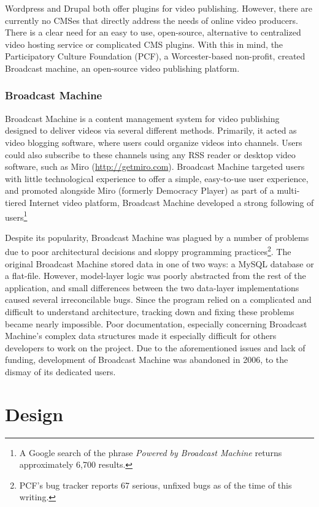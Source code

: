 \documentclass[a4paper,12pt]{report}
\begin{document}
Wordpress and Drupal both offer plugins for video publishing. However, there are currently no CMSes that directly address the needs of online video producers. There is a clear need for an easy to use, open-source, alternative to centralized video hosting service or complicated CMS plugins. With this in mind, the Participatory Culture Foundation (PCF), a Worcester-based non-profit, created Broadcast machine, an open-source video publishing platform.

\subsection {Broadcast Machine}
Broadcast Machine is a content management system for video publishing designed to deliver videos via several different methods. Primarily, 
it acted as video blogging software, where users could organize videos into channels. Users could also subscribe to these channels using any RSS reader or desktop video software, such as Miro (\url{http://getmiro.com}). Broadcast Machine targeted users with little technological experience to offer a simple, easy-to-use user experience, and promoted alongside Miro (formerly Democracy Player) as part of a multi-tiered Internet video platform, Broadcast Machine developed a strong following of users\footnote{A Google search of the phrase \textit{Powered by Broadcast Machine} returns approximately 6,700 results.}

Despite its popularity, Broadcast Machine was plagued by a number of problems due to poor architectural decisions and sloppy programming practices\footnote{PCF's bug tracker reports 67 serious, unfixed bugs as of the time of this writing.}. The original Broadcast Machine stored data in one of two ways: a MySQL database or a flat-file. However, model-layer logic was poorly abstracted from the rest of the application, and small differences between the two data-layer implementations caused several irreconcilable bugs. Since the program relied on a complicated and difficult to understand architecture, tracking down and fixing these problems became nearly impossible. Poor documentation, especially concerning Broadcast Machine's complex data structures made it especially difficult for others developers to work on the project. Due to the aforementioned issues and lack of funding, development of Broadcast Machine was abandoned in 2006, to the dismay of its dedicated users.

\chapter{Design}
\end{document}
